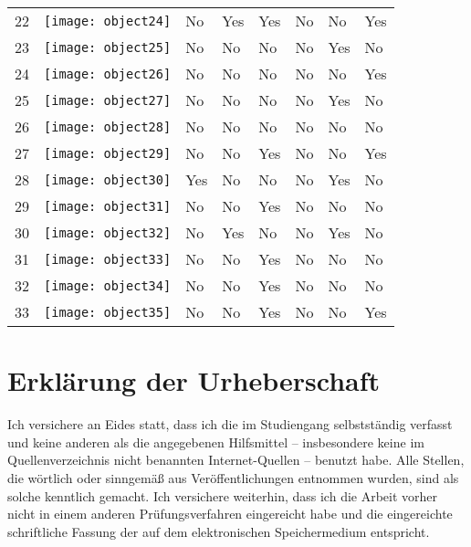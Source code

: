 \documentclass[12pt,final,twoside]{report}
\begin{document}
\begin{longtable}{rl*{6}{p{.08\linewidth}}}
22 & \texttt{[image: object24]} & No & Yes & Yes & No & No & Yes \\ 
23 & \texttt{[image: object25]} & No & No & No & No & Yes & No \\ 
24 & \texttt{[image: object26]} & No & No & No & No & No & Yes \\ 
25 & \texttt{[image: object27]} & No & No & No & No & Yes & No \\ 
26 & \texttt{[image: object28]} & No & No & No & No & No & No \\ 
27 & \texttt{[image: object29]} & No & No & Yes & No & No & Yes \\ 
28 & \texttt{[image: object30]} & Yes & No & No & No & Yes & No \\ 
29 & \texttt{[image: object31]} & No & No & Yes & No & No & No \\ 
30 & \texttt{[image: object32]} & No & Yes & No & No & Yes & No \\ 
31 & \texttt{[image: object33]} & No & No & Yes & No & No & No \\ 
32 & \texttt{[image: object34]} & No & No & Yes & No & No & No \\ 
33 & \texttt{[image: object35]} & No & No & Yes & No & No & Yes \\ 
\end{longtable}

\cleardoublepage




\cleardoublepage

\vspace{2cm}
\chapter*{Erkl\"arung der Urheberschaft}
Ich versichere an Eides statt, dass ich die \trtype{} im Studiengang \trcourseofstudies{} selbstst\"andig verfasst und keine anderen als die angegebenen Hilfsmittel -- insbesondere keine im Quellenverzeichnis nicht benannten Internet-Quellen -- benutzt habe. Alle Stellen, die w\"ortlich oder sinngem\"a{\ss} aus Ver\"offentlichungen entnommen wurden, sind als solche kenntlich gemacht. Ich versichere weiterhin, dass ich die Arbeit vorher nicht in einem anderen Pr\"ufungsverfahren eingereicht habe und die eingereichte schriftliche Fassung der auf dem elektronischen Speichermedium entspricht.
\end{document}
